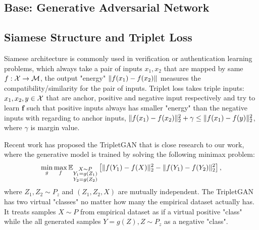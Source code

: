 \subsection{Base: Generative Adversarial Network}


\subsection{Siamese Structure and Triplet Loss}

Siamese architecture is commonly used in verification or
authentication learning problems\cite{1467314}, which always take a
pair of inputs $x_1, x_2$ that are mapped by same $f: \mathcal{X} \rightarrow
\mathcal{M}$, the output "energy" $\| f(x_1) - f(x_2) \|$ measures the
compatibility/similarity for the pair of inputs.
Triplet loss \cite{7298682} takes triple inputs: $x_1, x_2, y \in \mathcal{X}$
that are anchor, positive and negative input respectively and try to
learn $\bm{f}$ such that positive inputs always has smaller "energy" than
the negative inputs with regarding to anchor inputs,
$\| f(x_1)-f(x_2) \|_{2}^2 + \gamma \le \| f(x_1)-f(y) \|_{2}^2$, 
where $\gamma$ is margin value.


Recent work \cite{2017arXiv171105084C} has proposed 
the TripletGAN that is close research to
our work, where the generative model is trained by solving the
following minimax problem:
\begin{equation}
  \min_{g} \max_{f} \mathbb{E}_{{\substack{X\sim P \\ Y_1= g(Z_1)\\ Y_2 = g(Z_2)}}}\left[ \| f(Y_1)-f(X) \|_{2}^2 - \| f(Y_1)-f(Y_2) \|_{2}^2 \right],
\end{equation}
where $Z_1, Z_2 \sim P_z$ and $(Z_1,Z_2,X)$ are mutually independent. The TripletGAN has two virtual
"classes" no matter how many the empirical dataset actually has. It treats samples
$X\sim P$ from empirical dataset as if a virtual positive "class" while the all
generated samples $Y=g(Z), Z\sim P_z$ as a negative "class". 


